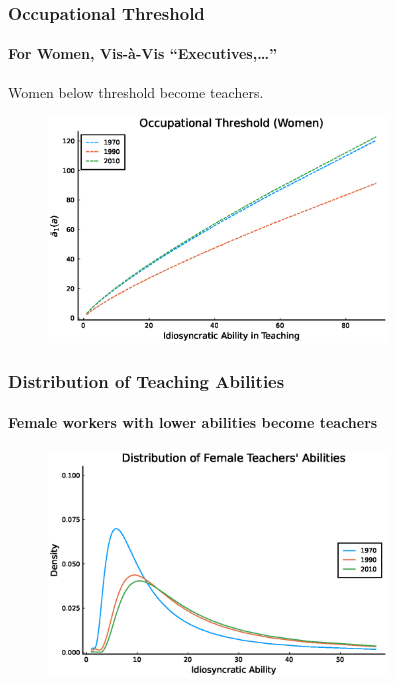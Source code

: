 \documentclass[11pt]{beamer}
\begin{document}
\begin{frame}
\frametitle{Occupational Threshold}
\framesubtitle{For Women, Vis-\`a-Vis ``Executives,\ldots''}
Women below threshold become teachers.
\begin{figure}
 \begin{center}
\includegraphics[width=0.8\textwidth]{plots/counterfactuals/counter_1/a_O_women.eps}
 			\label{ }
 		\end{center}
 	\end{figure}
\end{frame}

\begin{frame}
\frametitle{Distribution of Teaching Abilities}
\framesubtitle{Female workers with lower abilities become teachers}
\begin{figure}
 \begin{center}
\includegraphics[width=0.8\textwidth]{plots/counterfactuals/counter_1/fT_women_steadystate.eps}
 			\label{ }
 		\end{center}
 	\end{figure}
\end{frame}
\end{document}
